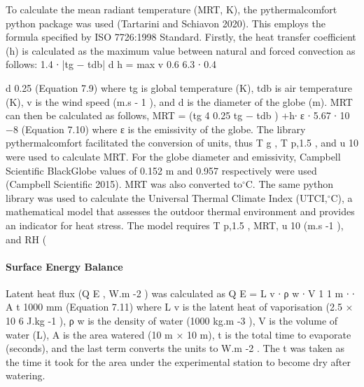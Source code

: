 \documentclass[final,3p,times,authoryear]{elsarticle}
\begin{document}
To calculate the mean radiant temperature (MRT, K), the pythermalcomfort python
package was used (Tartarini and Schiavon 2020). This employs the formula specified by
ISO 7726:1998 Standard. Firstly, the heat transfer coefficient (h) is calculated as the
maximum value between natural and forced convection as follows:
1.4 ∙ |tg − tdb|
d
h = max
v 0.6
6.3 ∙ 0.4
{
d
0.25
(Equation 7.9)
where tg is global temperature (K), tdb is air temperature (K), v is the wind speed (m.s -
1
), and d is the diameter of the globe (m). MRT can then be calculated as follows,
MRT = (tg
4
0.25
tg − tdb
)
+h∙
ε ∙ 5.67 ∙ 10 −8
(Equation 7.10)
where ε is the emissivity of the globe.
The library pythermalcomfort facilitated the conversion of units, thus T g , T p,1.5 , and u 10
were used to calculate MRT. For the globe diameter and emissivity, Campbell Scientific BlackGlobe values of 0.152 m and 0.957 respectively were used (Campbell Scientific
2015). MRT was also converted to$^{\circ}$C.
The same python library was used to calculate the Universal Thermal Climate Index
(UTCI,$^{\circ}$C), a mathematical model that assesses the outdoor thermal environment and
provides an indicator for heat stress. The model requires T p,1.5 , MRT, u 10 (m.s -1 ), and RH
(%


\paragraph{Surface Energy Balance}\label{sec:appendix7.4.5}

Latent heat flux (Q E , W.m -2 ) was calculated as
Q E = L v ∙ ρ w ∙
V 1
1 m
∙ ∙
A t 1000 mm
(Equation 7.11)
where L v is the latent heat of vaporisation (2.5 × 10 6 J.kg -1 ), ρ w is the density of water
(1000 kg.m -3 ), V is the volume of water (L), A is the area watered (10 m × 10 m), t is
the total time to evaporate (seconds), and the last term converts the units to W.m -2 . The t
was taken as the time it took for the area under the experimental station to become dry
after watering.

}
\end{document}
